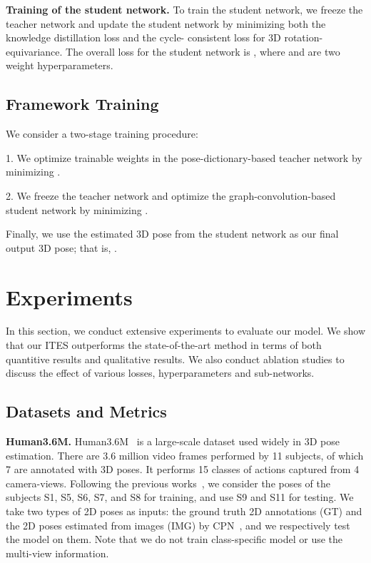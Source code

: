 \documentclass[letterpaper]{article} \usepackage{aaai21}  \usepackage{times}  \usepackage{helvet} \usepackage{courier}  \usepackage[hyphens]{url}  \usepackage{graphicx} \urlstyle{rm} \def\UrlFont{\rm}  \usepackage{natbib}  \usepackage{caption} \frenchspacing  \setlength{\pdfpagewidth}{8.5in}  \setlength{\pdfpageheight}{11in}
\begin{document}
\textbf{Training of the student network.}
To train the student network, we freeze the teacher network and update the student network by minimizing both the knowledge distillation loss and the cycle- consistent loss for 3D rotation-equivariance. The overall loss for the student network is , where  and  are two weight hyperparameters.

\subsection{Framework Training}
We consider a two-stage training procedure:

1. We optimize trainable weights in the pose-dictionary-based teacher network by minimizing .

2. We freeze the teacher network and optimize the graph-convolution-based student network by minimizing .

Finally, we use the estimated 3D pose from the student network as our final output 3D pose; that is, .

\section{Experiments}
\label{sec:experiment}
In this section, we conduct extensive experiments to evaluate our model. We show that our ITES outperforms the state-of-the-art method in terms of both quantitive results and qualitative results. We also conduct ablation studies to discuss the effect of various losses, hyperparameters and sub-networks.
\vspace{-1mm}
\subsection{Datasets and Metrics}
\textbf{Human3.6M.} Human3.6M~\cite{ionescu2013human3} is a large-scale dataset used widely in 3D pose estimation. There are 3.6 million video frames performed by 11 subjects, of which 7 are annotated with 3D poses. It performs 15 classes of actions captured from 4 camera-views. Following the previous works~\cite{martinez2017simple}, we consider the poses of the subjects S1, S5, S6, S7, and S8 for training, and use S9 and S11 for testing. We take two types of 2D poses as inputs: the ground truth 2D annotations (GT) and the 2D poses estimated from images (IMG) by CPN~\cite{chen2018cascaded}, and we respectively test the model on them. Note that we do not train class-specific model or use the multi-view information. 
\end{document}
